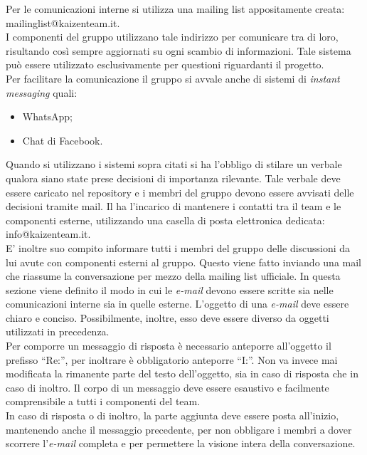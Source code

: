 				Per  le comunicazioni interne si utilizza una mailing list appositamente creata: mailinglist@kaizenteam.it.\\
				I componenti del gruppo utilizzano tale indirizzo per comunicare tra di loro, risultando così sempre aggiornati su ogni scambio di informazioni. Tale sistema può essere utilizzato esclusivamente per questioni riguardanti il progetto.\\
				Per facilitare la comunicazione il gruppo si avvale anche di sistemi di \textit{instant messaging} quali:
				\begin{itemize}
					\item WhatsApp;
					\item Chat di Facebook.
				\end{itemize}
				Quando si utilizzano i sistemi sopra citati si ha l'obbligo di stilare un verbale qualora siano state prese decisioni di importanza rilevante. Tale verbale deve essere caricato nel repository e i membri del gruppo devono essere avvisati delle decisioni tramite mail.
				Il  ha l’incarico di mantenere i contatti tra il team e le componenti esterne, utilizzando una casella di posta elettronica dedicata: info@kaizenteam.it.\\
				E' inoltre suo compito informare tutti i membri del gruppo delle discussioni da lui avute con componenti esterni al gruppo. Questo viene fatto inviando una mail che riassume la conversazione per mezzo della mailing list ufficiale.
				In questa sezione viene definito il modo in cui le \textit{e-mail} devono essere scritte sia nelle comunicazioni interne sia in quelle esterne.
					L’oggetto di una \textit{e-mail} deve essere chiaro e conciso. Possibilmente, inoltre, esso deve essere diverso da oggetti utilizzati in precedenza.\\
					Per comporre un messaggio di risposta è necessario anteporre all’oggetto il prefisso “Re:”, per inoltrare è obbligatorio anteporre “I:”. Non va invece mai modificata la rimanente parte del testo dell'oggetto, sia in caso di risposta che in caso di inoltro.
					Il corpo di un messaggio deve essere esaustivo e facilmente comprensibile a tutti i componenti del team.\\
					In caso di risposta o di inoltro, la parte aggiunta deve essere posta all’inizio, mantenendo anche il messaggio precedente, per non obbligare i membri a dover scorrere l’\textit{e-mail} completa e per permettere la visione intera della conversazione.
